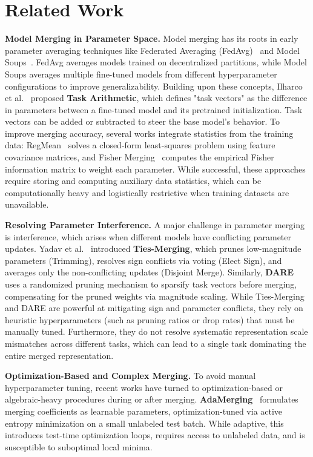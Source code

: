 \section{Related Work}
\label{submission:sec:related}

\textbf{Model Merging in Parameter Space.} Model merging has its roots in early parameter averaging techniques like Federated Averaging (FedAvg)~\cite{mcmahan2017communication} and Model Soups~\cite{wortsman2022model}. FedAvg averages models trained on decentralized partitions, while Model Soups averages multiple fine-tuned models from different hyperparameter configurations to improve generalizability. 
Building upon these concepts, Ilharco et al.~\cite{ilharco2022editing} proposed \textbf{Task Arithmetic}, which defines "task vectors" as the difference in parameters between a fine-tuned model and its pretrained initialization. Task vectors can be added or subtracted to steer the base model's behavior. To improve merging accuracy, several works integrate statistics from the training data: RegMean~\cite{jin2023raw} solves a closed-form least-squares problem using feature covariance matrices, and Fisher Merging~\cite{matena2022merging} computes the empirical Fisher information matrix to weight each parameter. While successful, these approaches require storing and computing auxiliary data statistics, which can be computationally heavy and logistically restrictive when training datasets are unavailable.

\textbf{Resolving Parameter Interference.} A major challenge in parameter merging is interference, which arises when different models have conflicting parameter updates. Yadav et al.~\cite{yadav2023resolving} introduced \textbf{Ties-Merging}, which prunes low-magnitude parameters (Trimming), resolves sign conflicts via voting (Elect Sign), and averages only the non-conflicting updates (Disjoint Merge). Similarly, \textbf{DARE}~\cite{yu24dare} uses a randomized pruning mechanism to sparsify task vectors before merging, compensating for the pruned weights via magnitude scaling. While Ties-Merging and DARE are powerful at mitigating sign and parameter conflicts, they rely on heuristic hyperparameters (such as pruning ratios or drop rates) that must be manually tuned. Furthermore, they do not resolve systematic representation scale mismatches across different tasks, which can lead to a single task dominating the entire merged representation.

\textbf{Optimization-Based and Complex Merging.} 
To avoid manual hyperparameter tuning, recent works have turned to optimization-based or algebraic-heavy procedures during or after merging. \textbf{AdaMerging}~\cite{yang2024adamerging} formulates merging coefficients as learnable parameters, optimization-tuned via active entropy minimization on a small unlabeled test batch. While adaptive, this introduces test-time optimization loops, requires access to unlabeled data, and is susceptible to suboptimal local minima. 

